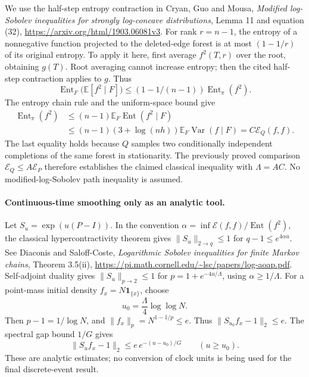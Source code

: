 \documentclass[11pt]{article}
\begin{document}
We use the half-step entropy contraction in Cryan, Guo and Mousa,
\emph{Modified log-Sobolev inequalities for strongly log-concave
distributions}, Lemma 11 and equation (32),
\url{https://arxiv.org/html/1903.06081v3}. For rank $r=n-1$, the
entropy of a nonnegative function projected to the deleted-edge
forest is at most $(1-1/r)$ of its original entropy.
To apply it here, first average $f^2(T,r)$ over the root, obtaining
$g(T)$. Root averaging cannot increase entropy; then the cited
half-step contraction applies to $g$. Thus
\[
 \operatorname{Ent}_{F}\bigl(\mathbb E[f^2\mid F]\bigr)
 \le(1-1/(n-1))\operatorname{Ent}_\pi(f^2).
\]
The entropy chain rule and the uniform-space bound give
\[
 \begin{split}
 \operatorname{Ent}_\pi(f^2)
 &\le(n-1)\mathbb E_F\operatorname{Ent}(f^2\mid F)\\
 &\le(n-1)(3+\log(nh))\mathbb E_F\operatorname{Var}(f\mid F)
 =C\mathcal E_Q(f,f).
 \end{split}
\]
The last equality holds because $Q$ samples two conditionally
independent completions of the same forest in stationarity.
The previously proved comparison $\mathcal E_Q\le A\mathcal E_P$
therefore establishes the claimed classical inequality with $\Lambda=AC$.
No modified-log-Sobolev path inequality is assumed.

\paragraph{Continuous-time smoothing only as an analytic tool.}
Let $S_u=\exp(u(P-I))$. In the convention
$\alpha=\inf\mathcal E(f,f)/\operatorname{Ent}(f^2)$, the classical
hypercontractivity theorem gives
$\|S_u\|_{2\to q}\le1$ for $q-1\le e^{4\alpha u}$.
See Diaconis and Saloff-Coste, \emph{Logarithmic Sobolev inequalities
for finite Markov chains}, Theorem 3.5(ii),
\url{https://pi.math.cornell.edu/~lsc/papers/log-aoap.pdf}.
Self-adjoint duality gives $\|S_u\|_{p\to2}\le1$ for
$p=1+e^{-4u/\Lambda}$, using $\alpha\ge1/\Lambda$.
For a point-mass initial density $f_x=N\mathbf1_{\{x\}}$, choose
\[
 u_0=\frac{\Lambda}4\log\log N.
\]
Then $p-1=1/\log N$, and
$\|f_x\|_p=N^{1-1/p}\le e$. Thus
$\|S_{u_0}f_x-1\|_2\le e$. The spectral gap bound $1/G$ gives
\[
 \|S_u f_x-1\|_2\le e\,e^{-(u-u_0)/G}\qquad(u\ge u_0).
\]
These are analytic estimates; no conversion of clock units is being
used for the final discrete-event result.
\end{document}
